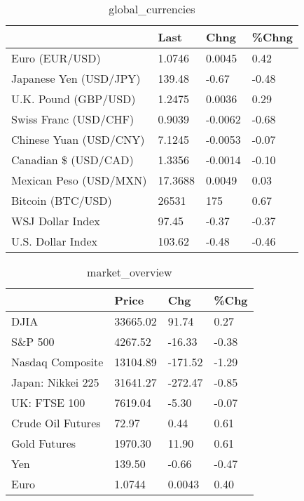 \documentclass{article}%
\begin{document}
%


\begin{table}[htbp]%
\caption{global\_currencies}%
\centering%
\begin{adjustbox}{width=1\textwidth}%
\begin{tabular}{llll}
\toprule
                       &    Last &    Chng & \%Chng \\
\midrule
        Euro (EUR/USD) &  1.0746 &  0.0045 &  0.42 \\
Japanese Yen (USD/JPY) &  139.48 &   -0.67 & -0.48 \\
  U.K. Pound (GBP/USD) &  1.2475 &  0.0036 &  0.29 \\
 Swiss Franc (USD/CHF) &  0.9039 & -0.0062 & -0.68 \\
Chinese Yuan (USD/CNY) &  7.1245 & -0.0053 & -0.07 \\
  Canadian \$ (USD/CAD) &  1.3356 & -0.0014 & -0.10 \\
Mexican Peso (USD/MXN) & 17.3688 &  0.0049 &  0.03 \\
     Bitcoin (BTC/USD) &   26531 &     175 &  0.67 \\
      WSJ Dollar Index &   97.45 &   -0.37 & -0.37 \\
     U.S. Dollar Index &  103.62 &   -0.48 & -0.46 \\
\bottomrule
\end{tabular}
%
\end{adjustbox}%
\end{table}

%


\begin{table}[htbp]%
\caption{market\_overview}%
\centering%
\begin{adjustbox}{width=1\textwidth}%
\begin{tabular}{llll}
\toprule
                  &    Price &     Chg &  \%Chg \\
\midrule
             DJIA & 33665.02 &   91.74 &  0.27 \\
          S\&P 500 &  4267.52 &  -16.33 & -0.38 \\
 Nasdaq Composite & 13104.89 & -171.52 & -1.29 \\
Japan: Nikkei 225 & 31641.27 & -272.47 & -0.85 \\
     UK: FTSE 100 &  7619.04 &   -5.30 & -0.07 \\
Crude Oil Futures &    72.97 &    0.44 &  0.61 \\
     Gold Futures &  1970.30 &   11.90 &  0.61 \\
              Yen &   139.50 &   -0.66 & -0.47 \\
             Euro &   1.0744 &  0.0043 &  0.40 \\
\bottomrule
\end{tabular}
%
\end{adjustbox}%
\end{table}

%
\end{document}
